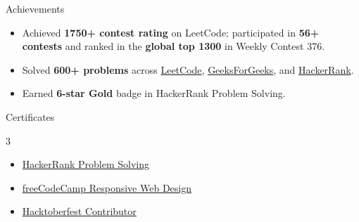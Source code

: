 \documentclass{resume}
\begin{document}
\begin{rSection}{Achievements}
\begin{itemize}
  \item Achieved \textbf{1750+ contest rating} on LeetCode; participated in
        \textbf{56+ contests} and ranked in the \textbf{global top 1300}
        in Weekly Contest 376.
  \item Solved \textbf{600+ problems} across
        \href{https://leetcode.com/u/Roshan_kumar7989/}{LeetCode},
        \href{https://auth.geeksforgeeks.org/user/roshan_sahu/}{GeeksForGeeks}, and
        \href{https://www.hackerrank.com/rsahu7989}{HackerRank}.
  \item Earned \textbf{6-star Gold} badge in HackerRank Problem Solving.
\end{itemize}
\end{rSection}


\begin{rSection}{Certificates}
\begin{multicols}{3}
\begin{itemize}
  \item \href{https://www.hackerrank.com/certificates/73bb80c83be4}{HackerRank Problem Solving}
  \item \href{https://www.freecodecamp.org/certification/Roshan_kumar7989/responsive-web-design}{freeCodeCamp Responsive Web Design}
  \item \href{https://tree-nation.com/certificate/6525e97fbca2d}{Hacktoberfest Contributor}
\end{itemize}
\end{multicols}
\end{rSection}
\end{document}
